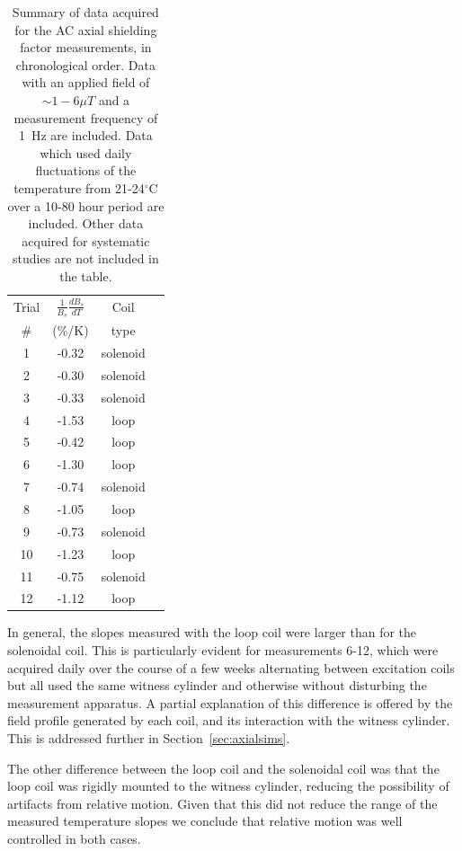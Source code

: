 \begin{table}
\begin{center}
\begin{tabular}{cccc}\hline
Trial & $\frac{1}{B_s}\frac{dB_s}{dT}$ & Coil \\
\#    & (\%/K) & type \\\hline
 1 & -0.32 & solenoid \\
 2 & -0.30 & solenoid \\
 3 & -0.33 & solenoid \\
 4 & -1.53 & loop \\
 5 & -0.42 & loop \\
 6 & -1.30 & loop \\
 7 & -0.74 & solenoid \\
 8 & -1.05 & loop \\
 9 & -0.73 & solenoid \\
10 & -1.23 & loop \\
11 & -0.75 & solenoid \\
12 & -1.12 & loop \\\hline
\end{tabular}
\caption{Summary of data acquired for the AC axial shielding factor
  measurements, in chronological order.  Data with an applied field of
  $\sim 1-6\mu T$ and a measurement frequency of 1~Hz are included.
  Data which used daily fluctuations of the temperature from
  21-24$^\circ$C over a 10-80 hour period are included.  Other data
  acquired for systematic studies are not included in the
  table.\label{tab:axial}}
\end{center}
\end{table}

In general, the slopes measured with the loop coil were larger than
for the solenoidal coil.  This is particularly evident for
measurements 6-12, which were acquired daily over the course of a few
weeks alternating between excitation coils but all used the same
witness cylinder and otherwise without disturbing the measurement
apparatus.  A partial explanation of this difference is offered by the
field profile generated by each coil, and its interaction with the
witness cylinder.  This is addressed further in
Section~\ref{sec:axialsims}.

The other difference between the loop coil and the solenoidal coil was
that the loop coil was rigidly mounted to the witness cylinder,
reducing the possibility of artifacts from relative motion.  Given
that this did not reduce the range of the measured temperature slopes
we conclude that relative motion was well controlled in both cases.

